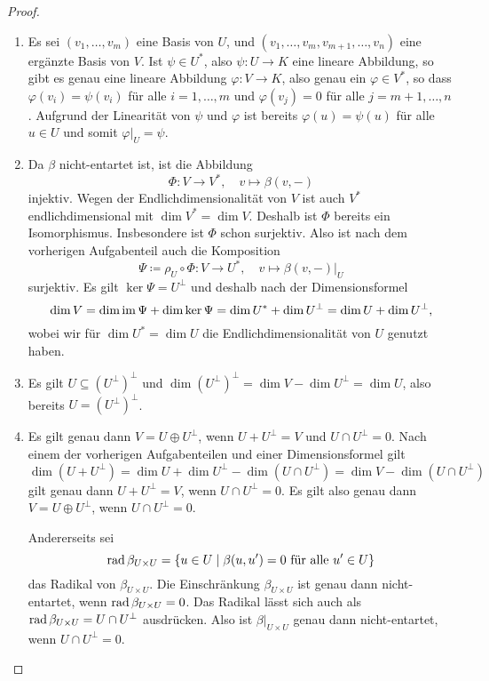 \documentclass[a4paper,10pt,numbers=noenddot]{scrartcl}
\begin{document}
\begin{proof}
  \begin{enumerate}[leftmargin=*]
    \item
      Es sei $(v_1, \dotsc, v_m)$ eine Basis von $U$, und $(v_1, \dotsc, v_m, v_{m+1}, \dotsc, v_n)$ eine ergänzte Basis von $V$.
      Ist $\psi \in U^*$, also $\psi \colon U \to K$ eine lineare Abbildung, so gibt es genau eine lineare Abbildung $\varphi \colon V \to K$, also genau ein $\varphi \in V^*$, so dass $\varphi(v_i) = \psi(v_i)$ für alle $i = 1, \dotsc, m$ und $\varphi(v_j) = 0$ für alle $j = m+1, \dotsc, n$.
      Aufgrund der Linearität von $\psi$ und $\varphi$ ist bereits $\varphi(u) = \psi(u)$ für alle $u \in U$ und somit $\varphi|_U = \psi$.
    \item
      Da $\beta$ nicht-entartet ist, ist die Abbildung
      \[
        \Phi \colon V \to V^*,
        \quad
        v \mapsto \beta(v, -)
      \]
      injektiv.
      Wegen der Endlichdimensionalität von $V$ ist auch $V^*$ endlichdimensional mit $\dim V^* = \dim V$.
      Deshalb ist $\Phi$ bereits ein Isomorphismus.
      Insbesondere ist $\Phi$ schon surjektiv.
      Also ist nach dem vorherigen Aufgabenteil auch die Komposition
      \[
        \Psi \coloneqq \rho_U \circ \Phi \colon V \to U^*,
        \quad
        v \mapsto \beta(v, -)|_U
      \]
      surjektiv.
      Es gilt $\ker \Psi = U^\perp$ und deshalb nach der Dimensionsformel
      \[
        \dim V
        = \dim \operatorname{im} \Psi + \dim \ker \Psi
        = \dim U^* + \dim U^\perp
        = \dim U + \dim U^\perp,
      \]
      wobei wir für $\dim U^* = \dim U$ die Endlichdimensionalität von $U$ genutzt haben.
    \item
      Es gilt $U \subseteq (U^\perp)^\perp$ und $\dim (U^\perp)^\perp = \dim V - \dim U^\perp = \dim U$, also bereits $U = (U^\perp)^\perp$.
    \item
      Es gilt genau dann $V = U \oplus U^\perp$, wenn $U + U^\perp = V$ und $U \cap U^\perp = 0$.
      Nach einem der vorherigen Aufgabenteilen und einer Dimensionsformel gilt
      \[
          \dim( U + U^\perp )
        = \dim U + \dim U^\perp - \dim( U \cap U^\perp )
        = \dim V - \dim (U \cap U^\perp )
      \]
      gilt genau dann $U + U^\perp = V$, wenn $U \cap U^\perp = 0$.
      Es gilt also genau dann $V = U \oplus U^\perp$, wenn $U \cap U^\perp = 0$.
      
      Andererseits sei
      \[
          \operatorname{rad} \beta_{U \times U}
        = \{ u \in U \mid \text{$\beta(u, u') = 0$ für alle $u' \in U$} \}
      \]
      das Radikal von $\beta_{U \times U}$.
      Die Einschränkung $\beta_{U \times U}$ ist genau dann nicht-entartet, wenn $\operatorname{rad} \beta_{U \times U} = 0$.
      Das Radikal lässt sich auch als $\operatorname{rad} \beta_{U \times U} = U \cap U^\perp$ ausdrücken.
      Also ist $\beta|_{U \times U}$ genau dann nicht-entartet, wenn $U \cap U^\perp = 0$.
      

\end{enumerate}
\end{proof}
\end{document}
